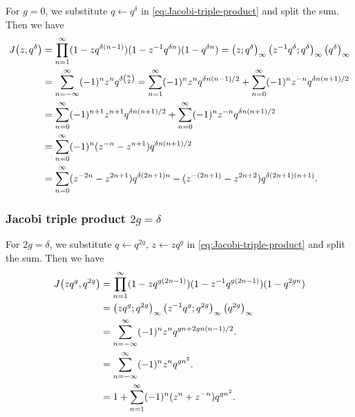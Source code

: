 \documentclass{article}
\begin{document}
For $g=0$, we substitute $q \gets q^\delta$ in
\eqref{eq:Jacobi-triple-product} and split the sum. Then we have
\begin{align}
  J\!\left(z,q^\delta\right)
  &=
  \prod_{n=1}^\infty
    (1-zq^{\delta (n-1)})
    (1-z^{-1}q^{\delta n})
    (1-q^{\delta n})
  =
    \left( z;q^\delta \right)_{\infty} \left( z^{-1}q^{\delta};q^\delta \right)_{\infty}
    \left({q}^{\delta}\right)_{\infty}
  \notag\\
  &=
    \sum_{n=-\infty}^\infty (-1)^nz^nq^{\delta \binom{n}{2}}
    =
    \sum_{n=1}^\infty (-1)^nz^nq^{\delta n(n-1)/2}
    +
    \sum_{n=0}^\infty (-1)^nz^{-n}q^{\delta n(n+1)/2}
  \notag\\
  &=
    \sum_{n=0}^\infty (-1)^{n+1}z^{n+1}q^{\delta n(n+1)/2}
    +
    \sum_{n=0}^\infty (-1)^nz^{-n}q^{\delta n(n+1)/2}
  \notag\\
  &=
    \sum_{n=0}^\infty (-1)^n(z^{-n}-z^{n+1})q^{\delta n(n+1)/2}
  \\
  &=
    \sum_{n=0}^\infty (z^{-2n}-z^{2n+1})q^{\delta (2n+1) n}
                   -(z^{-(2n+1)}-z^{2n+2})q^{\delta (2n+1) (n+1)}.
  \label{eq:Jacobi-g=0}
\end{align}

\subsubsection{Jacobi triple product $2g=\delta$}

For $2g=\delta$, we substitute $q \gets q^{2g}$, $z \gets z q^g$ in
\eqref{eq:Jacobi-triple-product} and split the sum. Then we have
\begin{align}
  J\!\left(zq^g,q^{2g}\right)
  &=
  \prod_{n=1}^\infty
    (1-zq^{g(2n-1)})
    (1-z^{-1}q^{g(2n-1)})
    (1-q^{2 g n})
  \notag\\
  &=
    \left( zq^g;q^{2g} \right)_{\infty} \left( z^{-1}q^g;q^{2g} \right)_{\infty}
    \left({q}^{2g}\right)_{\infty}
  \notag\\
  &=
    \sum_{n=-\infty}^\infty (-1)^nz^nq^{gn + 2g n (n-1)/2}.
  \notag\\
  &=
    \sum_{n=-\infty}^\infty (-1)^nz^nq^{gn^2}.
  \\
  &=
    1 + \sum_{n=1}^\infty (-1)^n(z^n + z^{-n})q^{gn^2}.
  \label{eq:Jacobi-2g=delta}
\end{align}
\end{document}
